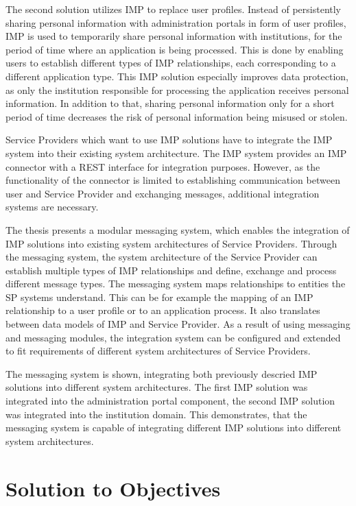 The second solution utilizes IMP to replace user profiles. Instead of persistently sharing personal information with administration portals in form of user profiles, IMP is used to temporarily share personal information with institutions, for the period of time where an application is being processed. This is done by enabling users to establish different types of IMP relationships, each corresponding to a different application type.
This IMP solution especially improves data protection, as only the institution responsible for processing the application receives personal information. In addition to that, sharing personal information only for a short period of time decreases the risk of personal information being misused or stolen.

Service Providers which want to use IMP solutions have to integrate the IMP system into their existing system architecture.
The IMP system provides an IMP connector with a REST interface for integration purposes. However, as the functionality of the connector is limited to establishing communication between user and Service Provider and exchanging messages, additional integration systems are necessary.

The thesis presents a modular messaging system, which enables the integration of IMP solutions into existing system architectures of Service Providers. Through the messaging system, the system architecture of the Service Provider can 
establish multiple types of IMP relationships and define, exchange and process different message types. The messaging system maps relationships to entities the SP systems understand. This can be for example the mapping of an IMP relationship to a user profile or to an application process. It also translates between data models of IMP and Service Provider. As a result of using messaging and messaging modules, the integration system can be configured and extended to fit requirements of different system architectures of Service Providers.

The messaging system is shown, integrating both previously descried IMP solutions into different system architectures. The first IMP solution was integrated into the administration portal component, the second IMP solution was integrated into the institution domain. This demonstrates, that the messaging system is capable of integrating different IMP solutions into different system architectures.

\section{Solution to Objectives}

